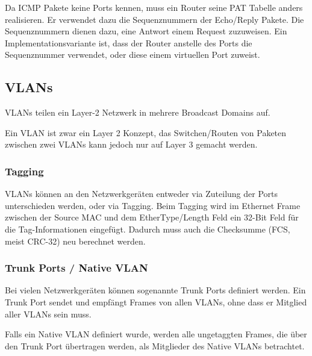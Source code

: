 Da ICMP Pakete keine Ports kennen, muss ein Router seine PAT Tabelle anders
realisieren. Er verwendet dazu die Sequenznummern der Echo/Reply Pakete. Die Sequenznummern
dienen dazu, eine Antwort einem Request zuzuweisen. Ein Implementationsvariante
ist, dass der Router anstelle des Ports die Sequenznummer verwendet, oder diese
einem virtuellen Port zuweist.


\subsection{VLANs}

VLANs teilen ein Layer-2 Netzwerk in mehrere Broadcast Domains auf.

Ein VLAN ist zwar ein Layer 2 Konzept, das Switchen/Routen von Paketen zwischen
zwei VLANs kann jedoch nur auf Layer 3 gemacht werden.

\subsubsection{Tagging}

VLANs können an den Netzwerkgeräten entweder via Zuteilung der Ports
unterschieden werden, oder via Tagging. Beim Tagging wird im Ethernet Frame
zwischen der Source MAC und dem EtherType/Length Feld ein 32-Bit Feld für die
Tag-Informationen eingefügt. Dadurch muss auch die Checksumme (FCS, meist
CRC-32) neu berechnet werden.

\subsubsection{Trunk Ports / Native VLAN}

Bei vielen Netzwerkgeräten können sogenannte Trunk Ports definiert werden.  Ein
Trunk Port sendet und empfängt Frames von allen VLANs, ohne dass er Mitglied
aller VLANs sein muss.

Falls ein Native VLAN definiert wurde, werden alle ungetaggten Frames, die über
den Trunk Port übertragen werden, als Mitglieder des Native VLANs betrachtet.
